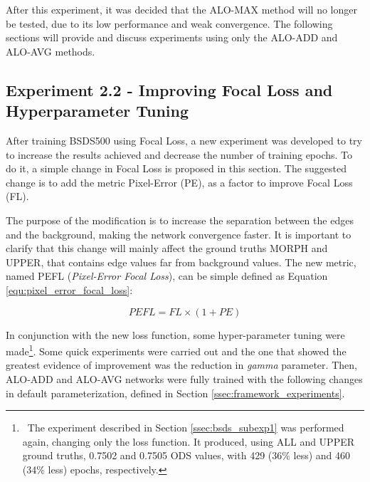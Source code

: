 
After this experiment, it was decided that the ALO-MAX method will no longer be tested, due to its low performance and weak convergence. %
The following sections will provide and discuss experiments using only the ALO-ADD and ALO-AVG methods.

\subsection{Experiment 2.2 - Improving Focal Loss and Hyperparameter Tuning}
\label{ssec:bsds_subexp2}

After training BSDS500 using Focal Loss, a new experiment was developed to try to increase the results achieved and decrease the number of training epochs.
To do it, a simple change in Focal Loss is proposed in this section.
The suggested change is to add the metric Pixel-Error (PE), as a factor to improve Focal Loss (FL).

The purpose of the modification is to increase the separation between the edges and the background, making the network convergence faster.
It is important to clarify that this change will mainly affect the ground truths MORPH and UPPER, that contains edge values far from background values.
The new metric, named PEFL (\textit{Pixel-Error Focal Loss}), can be simple defined as Equation \ref{equ:pixel_error_focal_loss}:

\begin{equation}
  PEFL = FL \times (1 + PE)
  \label{equ:pixel_error_focal_loss}
\end{equation}

In conjunction with the new loss function, some hyper-parameter tuning were made\footnote{~The experiment described in Section \ref{ssec:bsds_subexp1} was performed again, changing only the loss function. It produced, using ALL and UPPER ground truths, 0.7502 and 0.7505 ODS values, with 429 (36\% less) and 460 (34\% less) epochs, respectively.}.
Some quick experiments were carried out and the one that showed the greatest evidence of improvement was the reduction in \textit{gamma} parameter.
Then, ALO-ADD and ALO-AVG networks were fully trained with the following changes in default parameterization, defined in Section \ref{ssec:framework_experiments}.

